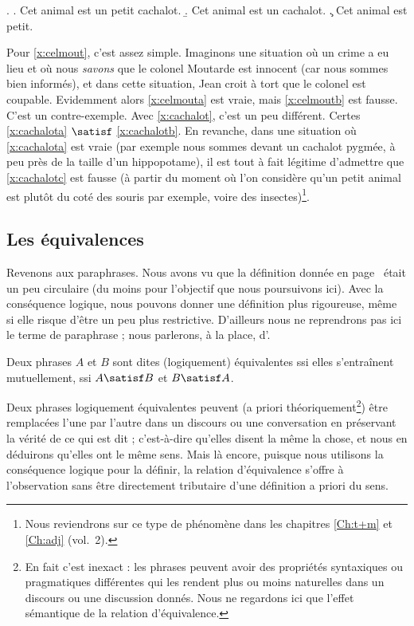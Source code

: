 \begin{refsegment}
\ex. \label{x:cachalot}
\a.  Cet animal est un petit cachalot. \label{x:cachalota}
\b. Cet animal est un cachalot. \label{x:cachalotb}
\c. Cet animal est petit. \label{x:cachalotc}



Pour \ref{x:celmout}, c'est assez simple. Imaginons une situation où
un crime a eu lieu et où nous \emph{savons} que le colonel Moutarde est
innocent (car nous sommes bien informés), et dans cette
situation, Jean croit à tort que le colonel est coupable. Evidemment
alors \ref{x:celmouta} est vraie, mais \ref{x:celmoutb}  est
fausse. C'est un contre-exemple.
Avec \ref{x:cachalot}, c'est un peu différent. Certes
\ref{x:cachalota} $\satisf$ \ref{x:cachalotb}.  En revanche, dans une
situation où \ref{x:cachalota} est vraie (par exemple nous sommes
devant un cachalot pygmée, à peu près de la taille d'un hippopotame),
il est tout à fait légitime d'admettre que \ref{x:cachalotc} est
fausse (à partir du moment où l'on considère qu'un petit animal est
plutôt du coté des souris par exemple, voire des
insectes)\footnote{Nous reviendrons sur ce type de phénomène dans les
  chapitres \ref{Ch:t+m} et \ref{Ch:adj} (vol.~2).}. 

\smallskip





\subsection{Les équivalences}
\label{ss:EquivalenceLogique}
Revenons aux paraphrases.  Nous  avons vu que la définition donnée en
page~\pageref{d:paraphrase} était
un peu  circulaire (du moins pour l'objectif que nous poursuivons
ici).  Avec la 
conséquence logique, nous pouvons donner une définition plus rigoureuse,
même si elle risque d'être un peu plus restrictive.  D'ailleurs nous
ne reprendrons pas ici le terme de paraphrase ; nous parlerons, à la
place, d'.

\begin{defi}
Deux phrases $A$ et $B$ sont dites (logiquement) équivalentes ssi elles s'entraînent mutuellement, {\ie} ssi $A
\satisf B$ et $B \satisf A$.
\end{defi}

Deux phrases logiquement équivalentes peuvent
({a priori} théoriquement\footnote{En fait c'est inexact : les phrases peuvent
avoir des propriétés syntaxiques ou pragmatiques différentes qui les
rendent plus ou moins naturelles dans un discours ou une discussion
donnés.  Nous ne regardons ici que l'effet sémantique de la relation
d'équivalence.}) être remplacées l'une par l'autre dans un discours ou
une conversation en préservant la vérité de ce qui est dit ;
c'est-à-dire qu'elles
disent la même la
chose, et nous en déduirons qu'elles ont le même sens.  Mais là
encore, puisque nous utilisons la conséquence logique pour la définir,
la relation d'équivalence s'offre à l'observation sans être
directement tributaire d'une définition {a priori} du sens.  


\end{refsegment}

